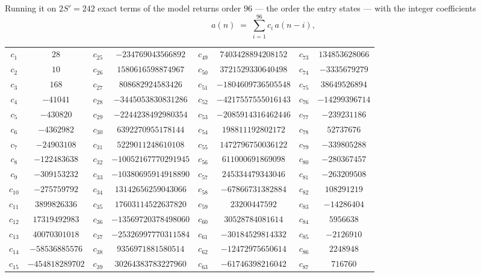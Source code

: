 \documentclass[11pt,a4paper]{article}
\theoremstyle{plain}
\theoremstyle{definition}
\begin{document}
Running it on $2S'=242$ exact terms of the model returns order $96$ --- the order the
entry states --- with the integer coefficients
\[
a(n)\;=\;\sum_{i=1}^{96}c_i\,a(n-i),
\]
\begin{center}\small
\begin{tabular}{cccccccc}
$c_{1}$ & $28$ & $c_{25}$ & $-234769043566892$ & $c_{49}$ & $7403428894208152$ & $c_{73}$ & $134853628066$ \\
$c_{2}$ & $10$ & $c_{26}$ & $1580616598874967$ & $c_{50}$ & $3721529330640498$ & $c_{74}$ & $-3335679279$ \\
$c_{3}$ & $168$ & $c_{27}$ & $808682924583426$ & $c_{51}$ & $-1804609736505548$ & $c_{75}$ & $38649526894$ \\
$c_{4}$ & $-41041$ & $c_{28}$ & $-3445053830831286$ & $c_{52}$ & $-4217557555016143$ & $c_{76}$ & $-14299396714$ \\
$c_{5}$ & $-430820$ & $c_{29}$ & $-2244238492980354$ & $c_{53}$ & $-2085914316462446$ & $c_{77}$ & $-239231186$ \\
$c_{6}$ & $-4362982$ & $c_{30}$ & $6392270955178144$ & $c_{54}$ & $198811192802172$ & $c_{78}$ & $52737676$ \\
$c_{7}$ & $-24903108$ & $c_{31}$ & $5229011248610108$ & $c_{55}$ & $1472796750036122$ & $c_{79}$ & $-339805288$ \\
$c_{8}$ & $-122483638$ & $c_{32}$ & $-10052167770291945$ & $c_{56}$ & $611000691869098$ & $c_{80}$ & $-280367457$ \\
$c_{9}$ & $-309153232$ & $c_{33}$ & $-10380695914918890$ & $c_{57}$ & $245334479343046$ & $c_{81}$ & $-263209508$ \\
$c_{10}$ & $-275759792$ & $c_{34}$ & $13142656259043066$ & $c_{58}$ & $-67866731382884$ & $c_{82}$ & $108291219$ \\
$c_{11}$ & $3899826336$ & $c_{35}$ & $17603114522637820$ & $c_{59}$ & $23200447592$ & $c_{83}$ & $-14286404$ \\
$c_{12}$ & $17319492983$ & $c_{36}$ & $-13569720378498060$ & $c_{60}$ & $30528784081614$ & $c_{84}$ & $5956638$ \\
$c_{13}$ & $40070301018$ & $c_{37}$ & $-25326997770311584$ & $c_{61}$ & $-30184529814332$ & $c_{85}$ & $-2126910$ \\
$c_{14}$ & $-58536885576$ & $c_{38}$ & $9356971881580514$ & $c_{62}$ & $-12472975650614$ & $c_{86}$ & $2248948$ \\
$c_{15}$ & $-454818289702$ & $c_{39}$ & $30264383783227960$ & $c_{63}$ & $-61746398216042$ & $c_{87}$ & $716760$ \\

\end{tabular}
\end{center}
\end{document}
